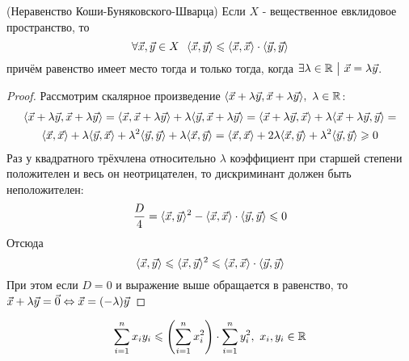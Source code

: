 \begin{theorem} (Неравенство Коши-Буняковского-Шварца)
	Если $X$ - вещественное евклидовое пространство, то
	\[
		\forall \vec{x}, \vec{y} \in X\ \ \langle\vec{x}, \vec{y}\rangle \leqslant \langle\vec{x}, \vec{x}\rangle \cdot \langle\vec{y}, \vec{y}\rangle
	\]
	причём равенство имеет место тогда и только тогда, когда $\exists \lambda \in \mathbb{R} \ \big|\  \vec{x} = \lambda \vec{y}$.
\end{theorem}

\begin{proof}
	Рассмотрим скалярное произведение $\langle\vec{x} + \lambda \vec{y}, \vec{x} + \lambda \vec{y}\rangle,\ \lambda \in \mathbb{R}$:
	\begin{multline*}
		\langle\vec{x} + \lambda \vec{y}, \vec{x} + \lambda \vec{y}\rangle = \langle\vec{x}, \vec{x} + \lambda\vec{y}\rangle + \lambda\langle\vec{y}, \vec{x} + \lambda\vec{y}\rangle = \langle\vec{x} + \lambda\vec{y}, \vec{x}\rangle + \lambda\langle\vec{x} + \lambda\vec{y}, \vec{y}\rangle =
		\\
		\langle\vec{x}, \vec{x}\rangle + \lambda\langle\vec{y}, \vec{x}\rangle + \lambda^2\langle\vec{y}, \vec{y}\rangle + \lambda\langle\vec{x}, \vec{y}\rangle = \langle\vec{x}, \vec{x}\rangle + 2\lambda\langle\vec{x}, \vec{y}\rangle + \lambda^2\langle\vec{y}, \vec{y}\rangle \geqslant 0
	\end{multline*}
	Раз у квадратного трёхчлена относительно $\lambda$ коэффициент при старшей степени положителен и весь он неотрицателен, то дискриминант должен быть неположителен:
	\[
		\frac{D}{4} = \langle\vec{x}, \vec{y}\rangle^2 - \langle\vec{x}, \vec{x}\rangle \cdot \langle\vec{y}, \vec{y}\rangle \leqslant 0
	\]
	Отсюда
	\[
		\langle\vec{x}, \vec{y}\rangle \leqslant \langle\vec{x}, \vec{y}\rangle^2 \leqslant \langle\vec{x}, \vec{x}\rangle \cdot \langle\vec{y}, \vec{y}\rangle
	\]
	При этом если $D = 0$ и выражение выше обращается в равенство, то $\vec{x} + \lambda\vec{y} = \vec{0} \Leftrightarrow \vec{x} = (-\lambda)\vec{y}$
\end{proof}

\begin{corollary}
	\[
		\sum\limits_{i = 1}^n x_i y_i \leqslant \left(\sum\limits_{i = 1}^n x_i^2\right) \cdot \sum\limits_{i = 1}^n y_i^2,\ x_i, y_i \in \mathbb{R}
	\]
\end{corollary}

